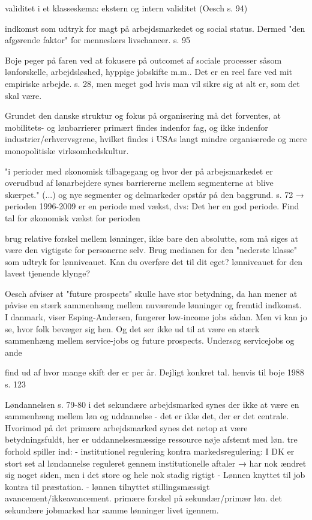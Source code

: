 validitet i et klasseskema: ekstern og intern validitet (Oesch s. 94)

indkomst som udtryk for magt på arbejdsmarkedet og social status. Dermed "den afgørende faktor" for menneskers livschancer. s. 95

Boje peger på faren ved at fokusere på outcomet af sociale processer såsom lønforskelle, arbejdsløshed, hyppige jobskifte m.m.. Det er en reel fare ved mit empiriske arbejde. s. 28, men meget god hvis man vil sikre sig at alt er, som det skal være. 

Grundet den danske struktur og fokus på organisering må det forventes, at mobilitets- og lønbarrierer primært findes indenfor fag, og ikke indenfor industrier/erhvervsgrene, hvilket findes i USAs langt mindre organiserede og mere monopolitiske virksomhedskultur. 

"i perioder med økonomisk tilbagegang og hvor der på arbejsmarkedet er overudbud af lønarbejdere synes barriererne mellem segmenterne at blive skærpet." (...) og nye segmenter og delmarkeder opstår på den baggrund. s. 72
→ perioden 1996-2009 er en periode med vækst, dvs: Det her en god periode. Find tal for økonomisk vækst for perioden


brug relative forskel mellem lønninger, ikke bare den absolutte, som må siges at være den vigtigste for personerne selv. Brug medianen for den "nederste klasse" som udtryk for lønniveauet. Kan du overføre det til dit eget? lønniveauet for den lavest tjenende klynge?

Oesch afviser at "future prospects" skulle have stor betydning, da han mener at påvise en stærk sammenhæng mellem nuværende lønninger og fremtid indkomst. I danmark, viser Esping-Andersen, fungerer low-income jobs sådan. Men vi kan jo se, hvor folk bevæger sig hen. Og det ser ikke ud til at være en stærk sammenhæng mellem service-jobs og future prospects. Undersøg servicejobs og ande


find ud af hvor mange skift der er per år. Dejligt konkret tal. henvis til boje 1988 s. 123




Løndannelsen s. 79-80
	i det sekundære arbejdsmarked synes der ikke at være en sammenhæng mellem løn og uddannelse - det er ikke det, der er det centrale. Hvorimod på det primære arbejdsmarked synes det netop at være betydningsfuldt, her er uddannelsesmæssige ressource nøje afstemt med løn. 
	tre forhold spiller ind:
	- institutionel regulering kontra markedsregulering: I DK er stort set al løndannelse reguleret gennem institutionelle aftaler 
	→ har nok ændret sig noget siden, men i det store og hele nok stadig rigtigt
	- Lønnen knyttet til job kontra til præstation.
	- lønnen tilnyttet stillingsmæssigt avancement/ikkeavancement. primære forskel på sekundær/primær løn. det sekundære jobmarked har samme lønninger livet igennem. 





















